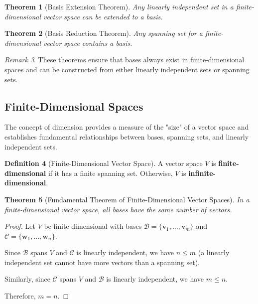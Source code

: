\documentclass[12pt]{article}
\numberwithin{equation}{section}
\newcommand{\vect}[1]{\boldsymbol{#1}}   %
\theoremstyle{plain}
\newtheorem{theorem}{Theorem}[section]
\theoremstyle{definition}
\newtheorem{definition}[theorem]{Definition}
\theoremstyle{remark}
\newtheorem{remark}[theorem]{Remark}
\begin{document}
\begin{theorem}[Basis Extension Theorem]
Any linearly independent set in a finite-dimensional vector space can be extended to a basis.
\end{theorem}

\begin{theorem}[Basis Reduction Theorem]
Any spanning set for a finite-dimensional vector space contains a basis.
\end{theorem}

\begin{remark}
These theorems ensure that bases always exist in finite-dimensional spaces and can be constructed from either linearly independent sets or spanning sets.
\end{remark}

\subsection{Finite-Dimensional Spaces}

The concept of dimension provides a measure of the "size" of a vector space and establishes fundamental relationships between bases, spanning sets, and linearly independent sets.

\begin{definition}[Finite-Dimensional Vector Space]
A vector space $V$ is \textbf{finite-dimensional} if it has a finite spanning set. Otherwise, $V$ is \textbf{infinite-dimensional}.
\end{definition}

\begin{theorem}[Fundamental Theorem of Finite-Dimensional Vector Spaces]
In a finite-dimensional vector space, all bases have the same number of vectors.
\end{theorem}

\begin{proof}
Let $V$ be finite-dimensional with bases $\mathcal{B} = \{\vect{v}_1, \ldots, \vect{v}_m\}$ and $\mathcal{C} = \{\vect{w}_1, \ldots, \vect{w}_n\}$.

Since $\mathcal{B}$ spans $V$ and $\mathcal{C}$ is linearly independent, we have $n \leq m$ (a linearly independent set cannot have more vectors than a spanning set).

Similarly, since $\mathcal{C}$ spans $V$ and $\mathcal{B}$ is linearly independent, we have $m \leq n$.

Therefore, $m = n$.
\end{proof}
\end{document}
